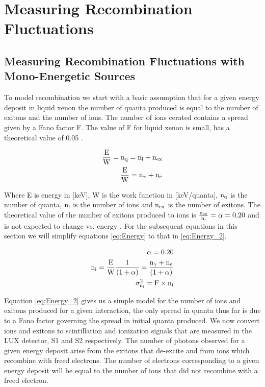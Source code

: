 \section{Measuring Recombination Fluctuations}

\subsection{Measuring Recombination Fluctuations with Mono-Energetic Sources}
\label{sec:flucs_mono}

To model recombination we start with a basic assumption that for a given energy deposit in liquid xenon the number of quanta produced is equal to the number of exitons and the number of ions. The number of ions cerated contains a spread given by a Fano factor F. The value of F for liquid xenon is small, has a theoretical value of 0.05 \cite{FanoTheoretical}.

\begin{equation}
\begin{split}
\rm  \frac{E}{W} = n_q = n_i + n_{ex}\\
\rm \frac{E}{W} = n_\gamma + n_e
\label{eq:Energy}
\end{split}
\end{equation}

Where E is energy in [keV], W is the work function in [keV/quanta], $\rm n_{q}$ is the number of quanta, $\rm n_{i}$ is the number of ions and $\rm n_{ex}$ is the number of exitons. The theoretical value of the number of exitons produced to ions is $\rm \frac{n_{ex}}{n_{i}}= \alpha = 0.20$ \cite{Doke_alpha} and is not expected to change vs. energy \cite{alpha_argon} \cite{alpha_xenon} \cite{Dahl_Thesis}. For the subsequent equations in this section we will simplify equations \ref{eq:Energy} to that in \ref{eq:Energy_2}.

\begin{equation}
\begin{split}
\rm \alpha = 0.20\\
\rm  n_i = \frac{E}{W} \frac{1}{(1+\alpha)} =  \frac{n_\gamma + n_e}{(1+\alpha)}  \\ %
\rm \sigma_{n_i}^2  = F \times n_i
\label{eq:Energy_2}
\end{split}
\end{equation}

Equation \ref{eq:Energy_2} gives us a simple model for the number of ions and exitons produced for a given interaction, the only spread in quanta thus far is due to a Fano factor governing the spread in initial quanta produced. We now convert ions and exitons to scintillation and ionization signals that are measured in the LUX detector, S1  and S2 respectively. The number of photons observed for a given energy deposit arise from the exitons that de-excite and from ions which recombine with freed electrons. The number of electrons corresponding to a given energy deposit will be equal to the number of ions that did not recombine with a freed electron. 

